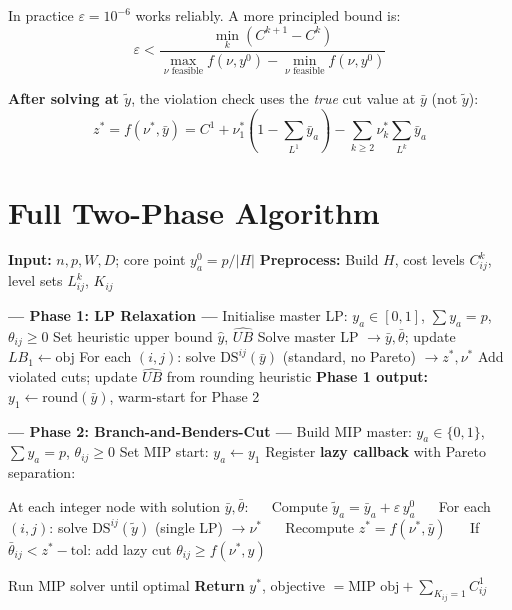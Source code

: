 \documentclass[12pt,a4paper]{article}
\begin{document}
In practice $\varepsilon = 10^{-6}$ works reliably.  A more principled bound is:
$$\varepsilon < \frac{\min_k (C^{k+1}-C^k)}{\max_{\nu\text{ feasible}} f(\nu,y^0) - \min_{\nu\text{ feasible}} f(\nu,y^0)}$$

\textbf{After solving at $\tilde{y}$}, the violation check uses the
\emph{true} cut value at $\bar{y}$ (not $\tilde{y}$):
$$z^* = f(\nu^*, \bar{y}) = C^1 + \nu^*_1\!\left(1-\sum_{L^1}\bar{y}_a\right)
  - \sum_{k\ge2}\nu^*_k\sum_{L^k}\bar{y}_a$$

\section{Full Two-Phase Algorithm}

\begin{algorithm}[H]
\caption{Two-Phase Pareto Benders for $p$-Hub-Arc}
\begin{algorithmic}[1]
\State \textbf{Input:} $n,p,W,D$; core point $y^0_a = p/|H|$
\State \textbf{Preprocess:} Build $H$, cost levels $C^k_{ij}$, level sets $L^k_{ij}$, $K_{ij}$

\vspace{0.3em}
\State \textbf{--- Phase 1: LP Relaxation ---}
\State Initialise master LP: $y_a \in [0,1]$, $\sum y_a = p$, $\theta_{ij}\ge 0$
\State Set heuristic upper bound $\widehat{y}$, $\widehat{UB}$
\Repeat
  \State Solve master LP $\to \bar{y}, \bar{\theta}$; update $LB_1 \leftarrow \text{obj}$
  \State For each $(i,j)$: solve $\text{DS}^{ij}(\bar{y})$ (standard, no Pareto) $\to z^*, \nu^*$
  \State Add violated cuts; update $\widehat{UB}$ from rounding heuristic
\State \textbf{Phase 1 output:} $y_1 \leftarrow \text{round}(\bar{y})$, warm-start for Phase 2

\vspace{0.3em}
\State \textbf{--- Phase 2: Branch-and-Benders-Cut ---}
\State Build MIP master: $y_a \in \{0,1\}$, $\sum y_a=p$, $\theta_{ij}\ge 0$
\State Set MIP start: $y_a \leftarrow y_1$
\State Register \textbf{lazy callback} with Pareto separation:
\begin{ALC@g}
  \State At each integer node with solution $\bar{y}, \bar{\theta}$:
  \State $\quad$ Compute $\tilde{y}_a = \bar{y}_a + \varepsilon\, y^0_a$
  \State $\quad$ For each $(i,j)$: solve $\text{DS}^{ij}(\tilde{y})$ (single LP) $\to \nu^*$
  \State $\quad$ Recompute $z^* = f(\nu^*, \bar{y})$
  \State $\quad$ If $\bar{\theta}_{ij} < z^* - \text{tol}$: add lazy cut $\theta_{ij} \ge f(\nu^*, y)$
\end{ALC@g}
\State Run MIP solver until optimal
\State \textbf{Return} $y^*$, objective $= \text{MIP obj} + \sum_{K_{ij}=1}C^1_{ij}$
\end{algorithmic}
\end{algorithm}
\end{document}
